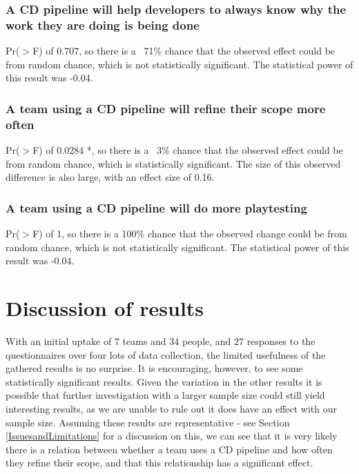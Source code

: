 \documentclass[journal]{IEEEtran}
\begin{document}
        \subsubsection{A CD pipeline will help developers to always know why the work they are doing is being done}
            Pr($>$F) of 0.707, so there is a ~71\% chance that the observed effect could be from random chance, which is not statistically significant. The statistical power of this result was -0.04. \\

        \subsubsection{A team using a CD pipeline will refine their scope more often}
            Pr($>$F) of 0.0284 *, so there is a ~3\% chance that the observed effect could be from random chance, which is statistically significant. The size of this observed difference is also large, with an effect size of 0.16. \\

        \subsubsection{A team using a CD pipeline will do more playtesting}
            Pr($>$F) of 1, so there is a 100\% chance that the observed change could be from random chance, which is not statistically significant. The statistical power of this result was -0.04. \\

\section{Discussion of results}
    With an initial uptake of 7 teams and 34 people, and 27 responses to the questionnaires over four lots of data collection, the limited usefulness of the gathered results is no surprise. It is encouraging, however, to see some statistically significant results. Given the variation in the other results it is possible that further investigation with a larger sample size could still yield interesting results, as we are unable to rule out it does have an effect with our sample size. Assuming these results are representative - see Section \ref{IssuesandLimitations} for a discussion on this, we can see that it is very likely there is a relation between whether a team uses a CD pipeline and how often they refine their scope, and that this relationship has a significant effect.
\end{document}

